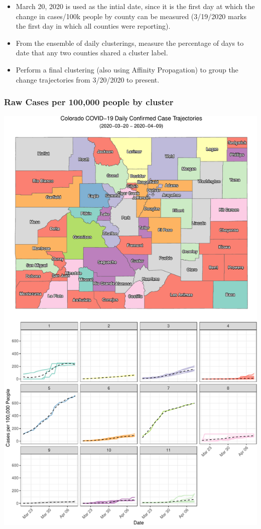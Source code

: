\documentclass[]{article}
\begin{document}
\begin{itemize}
\item
  March 20, 2020 is used as the intial date, since it is the first day
  at which the change in cases/100k people by county can be measured
  (3/19/2020 marks the first day in which all counties were reporting).
\item
  From the ensemble of daily clusterings, measure the percentage of days
  to date that any two counties shared a cluster label.
\item
  Perform a final clustering (also using Affinity Propagation) to group
  the change trajectories from 3/20/2020 to present.
\end{itemize}

\hypertarget{raw-cases-per-100000-people-by-cluster}{%
\subsubsection{Raw Cases per 100,000 people by
cluster}\label{raw-cases-per-100000-people-by-cluster}}

\includegraphics{figs/county-clusters-raw-1.pdf}
\end{document}
